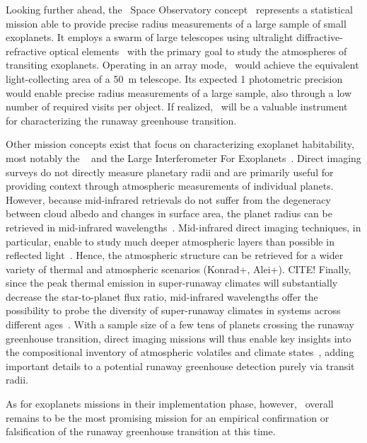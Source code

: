 \documentclass[twocolumn,twocolappendix]{aastex631}
\begin{document}
Looking further ahead, the \nautilus\ Space Observatory concept~\citep{Apai2019} represents a statistical mission able to provide precise radius measurements of a large sample of small exoplanets.
It employs a swarm of large telescopes using ultralight diffractive-refractive optical elements~\citep{Milster2020} with the primary goal to study the atmospheres of transiting exoplanets.
Operating in an array mode, \nautilus\ would achieve the equivalent light-collecting area of a \SI{50}{\meter} telescope.
Its expected \SI{1}{\ppm} photometric precision~\citep{Apai2022} would enable precise radius measurements of a large sample, also through a low number of required visits per object.
If realized, \nautilus\ will be a valuable instrument for characterizing the runaway greenhouse transition.

Other mission concepts exist that focus on characterizing exoplanet habitability, most notably the \hwo~\citep{Gaudi2020c,LUVOIR2019} and the Large Interferometer For Exoplanets~\citep[\life,][]{Quanz2021}.
Direct imaging surveys do not directly measure planetary radii and are primarily useful for providing context through atmospheric measurements of individual planets.
However, because mid-infrared retrievals do not suffer from the degeneracy between cloud albedo and changes in surface area, the planet radius can be retrieved in mid-infrared wavelengths~\citep{2018ExA....46..543D,2021ExA...tmp..118Q}.
Mid-infrared direct imaging techniques, in particular, enable to study much deeper atmospheric layers than possible in reflected light~\citep{Wordsworth2022}.
Hence, the atmospheric structure can be retrieved for a wider variety of thermal and atmospheric scenarios (Konrad+, Alei+). CITE!
Finally, since the peak thermal emission in super-runaway climates will substantially decrease the star-to-planet flux ratio, mid-infrared wavelengths offer the possibility to probe the diversity of super-runaway climates in systems across different ages~\citep{2014ApJ...784...27L,2019A&A...621A.125B}.
With a sample size of a few tens of planets crossing the runaway greenhouse transition, direct imaging missions will thus enable key insights into the compositional inventory of atmospheric volatiles and climate states~\citep{2021exbi.book....5H,2022arXiv220505696C}, adding important details to a potential runaway greenhouse detection purely via transit radii.

As for exoplanets missions in their implementation phase, however, \plato\ overall remains to be the most promising mission for an empirical confirmation or falsification of the runaway greenhouse transition at this time.
\end{document}
